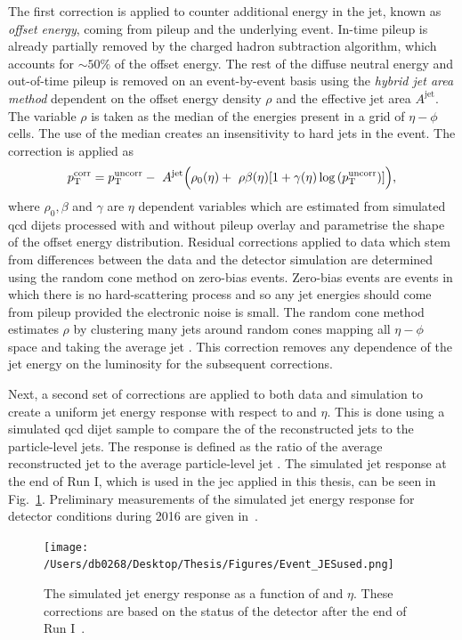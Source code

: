 The first correction is applied to counter additional energy in the jet, known as \textit{offset energy}, coming from pileup and the underlying event. 
In-time pileup is already partially removed by the charged hadron subtraction algorithm, which accounts for $\sim50\%$ of the offset energy.
The rest of the diffuse neutral energy and out-of-time pileup is removed on an event-by-event basis using the \textit{hybrid jet area method} dependent on the offset energy density $\rho$ and the effective jet area $A^{\mathrm{jet}}$.
The variable $\rho$ is taken as the median of the energies present in a grid of $\eta - \phi$ cells.
The use of the median creates an insensitivity to hard jets in the event.   
The correction is applied as
\begin{equation}
	\pt^{\mathrm{corr}} = \pt^{\mathrm{uncorr}} - \
	A^{\mathrm{jet}}\Big(\rho_{0}(\eta) + \
	\rho\beta(\eta)[1+\gamma(\eta)\log{(\pt^{\mathrm{uncorr}})]\Big)},
\end{equation}
where $\rho_{0}, \beta$ and $\gamma$ are $\eta$ dependent variables which are estimated from simulated \acrshort{qcd} dijets processed with and without pileup overlay and parametrise the shape of the offset energy distribution.
Residual corrections applied to data which stem from differences between the data and the detector simulation are determined using the random cone method on zero-bias events.
Zero-bias events are events in which there is no hard-scattering process and so any jet energies should come from pileup provided the electronic noise is small.
The random cone method estimates $\rho$ by clustering many jets around random cones mapping all $\eta-\phi$ space and taking the average jet \pt{}.
This correction removes any dependence of the jet energy on the luminosity for the subsequent corrections.

Next, a second set of corrections are applied to both data and simulation to create a uniform jet energy response with respect to \pt{} and $\eta$.
This is done using a simulated \acrshort{qcd} dijet sample to compare the \pt{} of the reconstructed jets to the particle-level jets.
The response is defined as the ratio of the average reconstructed jet \pt{} to the average particle-level jet \pt{}.
The simulated jet response at the end of Run I, which is used in the \acrshort{jec} applied in this thesis, can be seen in Fig.~\ref{fig:JES}.
Preliminary measurements of the simulated jet energy response for detector conditions during 2016 are given in~\cite{Event:JEC2016RunII}.
\begin{figure}[htpb!]
	\centering
	\texttt{[image: /Users/db0268/Desktop/Thesis/Figures/Event\_JESused.png]}
	\caption[The simulated jet energy response as a function of \pt{} and $\eta$. These corrections are based on the status of the detector after the end of Run I.]{The simulated jet energy response as a function of \pt{} and $\eta$. These corrections are based on the status of the detector after the end of Run I~\cite{Event:JEC}.}
	\label{fig:JES}
\end{figure}


